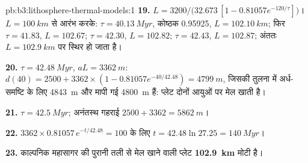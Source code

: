 \begin{solution}{pb:b3:lithosphere-thermal-models:1}
\textbf{19.} $L = 3200/\bigl(32.673\,[1 - 0.81057e^{-120/\tau}]\bigr)$।
$L = \qty{100}{km}$ से आरंभ करके: $\tau = \qty{40.13}{Myr}$, कोष्ठक 0.95925, $L =
\qty{102.10}{km}$; फिर $\tau = 41.83$, $L = 102.67$; $\tau = 42.30$, $L =
102.82$; $\tau = 42.43$, $L = 102.87$; अंततः $L = \qty{102.9}{km}$ पर स्थिर हो जाता है।

\textbf{20.} $\tau = \qty{42.48}{Myr}$, $aL = \qty{3362}{m}$: $d(40) = 2500 +
3362\times(1 - 0.81057e^{-40/42.48}) = \qty{4799}{m}$, जिसकी तुलना में अर्ध-समष्टि के लिए
\qty{4843}{m} और मापी गई \qty{4800}{m} हैं: प्लेट दोनों आयुओं पर मेल खाती है।

\textbf{21.} $\tau = \qty{42.5}{Myr}$; अनंतस्थ गहराई $2500 + 3362 =
\qty{5862}{m}$।

\textbf{22.} $3362\times0.81057\,e^{-t/42.48} = 100$ के लिए $t = 42.48\ln27.25 =
\qty{140}{Myr}$।

\textbf{23.} काल्पनिक महासागर की पुरानी तली से मेल खाने वाली प्लेट
\textbf{\qty[text-series-to-math=true]{102.9}{km}} मोटी है।
\end{solution}
